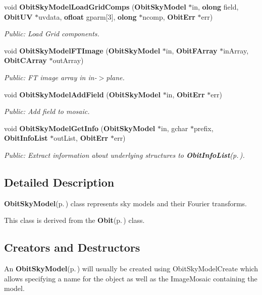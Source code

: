 \begin{CompactItemize}
void {\bf Obit\-Sky\-Model\-Load\-Grid\-Comps} ({\bf Obit\-Sky\-Model} $\ast$in, {\bf olong} field, {\bf Obit\-UV} $\ast$uvdata, {\bf ofloat} gparm[3], {\bf olong} $\ast$ncomp, {\bf Obit\-Err} $\ast$err)
\begin{CompactList}\small\item\em Public: Load Grid components. \item\end{CompactList}\item 
void {\bf Obit\-Sky\-Model\-FTImage} ({\bf Obit\-Sky\-Model} $\ast$in, {\bf Obit\-FArray} $\ast$in\-Array, {\bf Obit\-CArray} $\ast$out\-Array)
\begin{CompactList}\small\item\em Public: FT image array in in-$>$plane. \item\end{CompactList}\item 
void {\bf Obit\-Sky\-Model\-Add\-Field} ({\bf Obit\-Sky\-Model} $\ast$in, {\bf Obit\-Err} $\ast$err)
\begin{CompactList}\small\item\em Public: Add field to mosaic. \item\end{CompactList}\item 
void {\bf Obit\-Sky\-Model\-Get\-Info} ({\bf Obit\-Sky\-Model} $\ast$in, gchar $\ast$prefix, {\bf Obit\-Info\-List} $\ast$out\-List, {\bf Obit\-Err} $\ast$err)
\begin{CompactList}\small\item\em Public: Extract information about underlying structures to {\bf Obit\-Info\-List}{\rm (p.\,\pageref{structObitInfoList})}. \item\end{CompactList}\end{CompactItemize}


\subsection{Detailed Description}
{\bf Obit\-Sky\-Model}{\rm (p.\,\pageref{structObitSkyModel})} class represents sky models and their Fourier transforms. 

This class is derived from the {\bf Obit}{\rm (p.\,\pageref{structObit})} class.\subsection{Creators and Destructors}\label{ObitSkyModel_8h_ObitSkyModelaccess}
An {\bf Obit\-Sky\-Model}{\rm (p.\,\pageref{structObitSkyModel})} will usually be created using Obit\-Sky\-Model\-Create which allows specifying a name for the object as well as the Image\-Mosaic containing the model.

